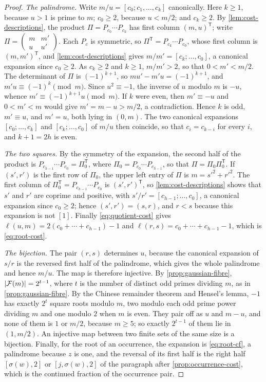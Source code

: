 \begin{proof}
\emph{The palindrome.} Write $m/u=[c_0;c_1,\ldots,c_k]$ canonically. Here
$k\geqslant1$, because $u>1$ is prime to $m$; $c_0\geqslant2$, because $u<m/2$; and
$c_k\geqslant2$. By \cref{lem:cost-descriptions}, the product
$\Pi=P_{c_0}\cdots P_{c_k}$ has first column $(m,u)^{\mathsf T}$; write
$\Pi=\left(\begin{smallmatrix}m&m'\\u&u'\end{smallmatrix}\right)$. Each $P_c$ is
symmetric, so $\Pi^{\mathsf T}=P_{c_k}\cdots P_{c_0}$, whose first column is
$(m,m')^{\mathsf T}$, and \cref{lem:cost-descriptions} gives
$m/m'=[c_k;\ldots,c_0]$, a canonical expansion since $c_0\geqslant2$. As $c_k\geqslant2$
and $k\geqslant1$, $m/m'>2$, so that $0<m'<m/2$. The determinant of $\Pi$ is
$(-1)^{k+1}$, so $mu'-m'u=(-1)^{k+1}$, and $m'u\equiv(-1)^k\pmod m$. Since
$u^2\equiv-1$, the inverse of $u$ modulo $m$ is $-u$, whence
$m'\equiv(-1)^{k+1}u\pmod m$. If $k$ were even, then $m'\equiv-u$ and
$0<m'<m$ would give $m'=m-u>m/2$, a contradiction. Hence $k$ is odd,
$m'\equiv u$, and $m'=u$, both lying in $(0,m)$. The two canonical expansions
$[c_0;\ldots,c_k]$ and $[c_k;\ldots,c_0]$ of $m/u$ then coincide, so that
$c_i=c_{k-i}$ for every $i$, and $k+1=2h$ is even.

\emph{The two squares.} By the symmetry of the expansion, the second half of
the product is $P_{c_{h-1}}\cdots P_{c_0}=\Pi_0^{\mathsf T}$, where
$\Pi_0=P_{c_0}\cdots P_{c_{h-1}}$, so that $\Pi=\Pi_0\Pi_0^{\mathsf T}$. If
$(s',r')$ is the first row of $\Pi_0$, the upper left entry of $\Pi$ is
$m=s'^2+r'^2$. The first column of $\Pi_0^{\mathsf T}=P_{c_{h-1}}\cdots P_{c_0}$ is
$(s',r')^{\mathsf T}$, so \cref{lem:cost-descriptions} shows that $s'$ and $r'$ are
coprime and positive, with $s'/r'=[c_{h-1};\ldots,c_0]$, a canonical
expansion since $c_0\geqslant2$; hence $(s',r')=(s,r)$, and $r<s$ because this
expansion is not $[1]$. Finally \eqref{eq:quotient-cost} gives
$\ell(u,m)=2(c_0+\cdots+c_{h-1})-1$ and $\ell(r,s)=c_0+\cdots+c_{h-1}-1$, which
is \eqref{eq:root-cost}.

\emph{The bijection.} The pair $(r,s)$ determines $u$, because the canonical
expansion of $s/r$ is the reversed first half of the palindrome, which gives
the whole palindrome and hence $m/u$. The map is therefore injective. By \cref{prop:gaussian-fibre},
$\lvert\mathcal F(m)\rvert=2^{t-1}$, where $t$ is the number of distinct odd primes
dividing $m$, as in \cref{prop:gaussian-fibre}. By the Chinese remainder theorem and Hensel's lemma, $-1$ has
exactly $2^{t}$ square roots modulo $m$, two modulo each odd prime power
dividing $m$ and one modulo $2$ when $m$ is even. They pair off as $u$ and
$m-u$, and none of them is $1$ or $m/2$, because $m\geqslant5$; so exactly
$2^{t-1}$ of them lie in $(1,m/2)$. An injective map between two finite sets
of the same size is a bijection. Finally, for the root of an occurrence, the
expansion is \eqref{eq:root-cf}, a palindrome because $z$ is one, and the
reversal of its first half is the right half $[\sigma(w),2]$ or
$[j,\sigma(w),2]$ of the paragraph after \cref{prop:occurrence-cost}, which is
the continued fraction of the occurrence pair.
\end{proof}


